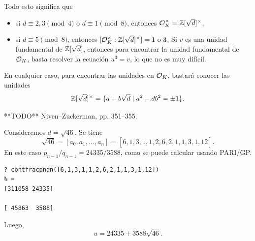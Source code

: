 Todo esto significa que
\begin{itemize}
\item si $d \equiv 2,3 \pmod{4}$ o $d \equiv 1 \pmod{8}$, entonces
  $\mathcal{O}_K^\times = \mathbb{Z} [\sqrt{d}]^\times$,

\item si $d \equiv 5 \pmod{8}$, entonces
  $[\mathcal{O}_K^\times : \mathbb{Z} [\sqrt{d}]^\times] = 1\text{ o }3$.
  Si $v$ es una unidad fundamental de $\mathbb{Z} [\sqrt{d}]$, entonces para encontrar
  la unidad fundamental de $\mathcal{O}_K$, basta resolver la ecuación $u^3 = v$, lo que
  no es muy difícil.
\end{itemize}
En cualquier caso, para encontrar las unidades en $\mathcal{O}_K$, bastará conocer las
unidades
$$\mathbb{Z} [\sqrt{d}]^\times = \{ a + b\sqrt{d} \mid a^2 - db^2 = \pm 1 \}.$$

**TODO** Niven--Zuckerman, pp. 351--355.

\begin{ejemplo}
  Consideremos $d = \sqrt{46}$. Se tiene
  $$\sqrt{46} = [a_0, \overline{a_1,\ldots,a_n}] = [6,\overline{1,3,1,1,2,6,2,1,1,3,1,12}].$$
  En este caso $p_{n-1}/q_{n-1} = 24335/3588$, como se puede calcular usando
  PARI/GP.
\begin{verbatim}
? contfracpnqn([6,1,3,1,1,2,6,2,1,1,3,1,12])
% = 
[311058 24335]

[ 45863  3588]
\end{verbatim}
  Luego,
  $$u = 24335 + 3588 \sqrt{46}.$$
\end{ejemplo}

